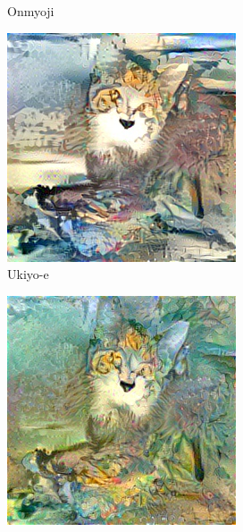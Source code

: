 \documentclass[10pt,twocolumn,letterpaper]{article}
\begin{document}
\begin{figure}
\begin{subfigure}[b]{0.18\textwidth}
    \caption{Onmyoji}
    \label{fig::base32}
  \end{subfigure}
  \begin{subfigure}[b]{0.18\textwidth}
    \includegraphics[width=\textwidth]{figure/baseline3/fsh.jpg}
    \caption{Ukiyo-e}
    \label{fig::base33}
  \end{subfigure}
  \begin{subfigure}[b]{0.18\textwidth}
    \includegraphics[width=\textwidth]{figure/baseline3/fg.jpg}

\end{subfigure}
\end{figure}
\end{document}
